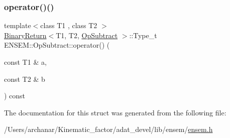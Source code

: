 \mbox{\label{structENSEM_1_1OpSubtract_ac246484950e9df9cb101370fd5f7f6b0}} 
\subsubsection{\texorpdfstring{operator()()}{operator()()}\hspace{0.1cm}{\footnotesize\ttfamily [2/2]}}
{\footnotesize\ttfamily template$<$class T1 , class T2 $>$ \\
\mbox{\hyperlink{structENSEM_1_1BinaryReturn}{Binary\+Return}}$<$T1, T2, \mbox{\hyperlink{structENSEM_1_1OpSubtract}{Op\+Subtract}} $>$\+::Type\+\_\+t E\+N\+S\+E\+M\+::\+Op\+Subtract\+::operator() (\begin{DoxyParamCaption}\item[{const T1 \&}]{a,  }\item[{const T2 \&}]{b }\end{DoxyParamCaption}) const\hspace{0.3cm}{\ttfamily [inline]}}



The documentation for this struct was generated from the following file\+:\begin{DoxyCompactItemize}
\item 
/\+Users/archanar/\+Kinematic\+\_\+factor/adat\+\_\+devel/lib/ensem/\mbox{\hyperlink{lib_2ensem_2ensem_8h}{ensem.\+h}}\end{DoxyCompactItemize}
